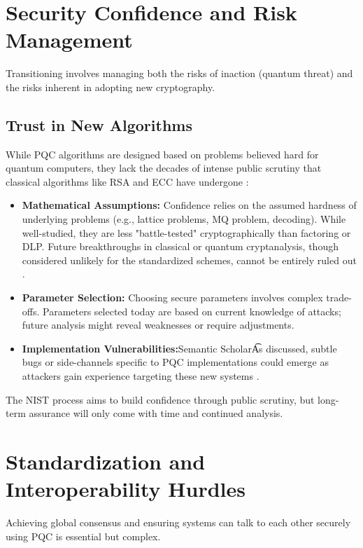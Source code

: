 \newpage

\section{Security Confidence and Risk Management}\label{sec:security_ch7_rev}
Transitioning involves managing both the risks of inaction (quantum threat) and the risks inherent in adopting new cryptography.

\subsection{Trust in New Algorithms}\label{subsec:trust_ch7_rev}
While PQC algorithms are designed based on problems believed hard for quantum computers, they lack the decades of intense public scrutiny that classical algorithms like RSA and ECC have undergone \parencite{security_proofs_2024}:

\begin{itemize}
    \item \textbf{Mathematical Assumptions:} Confidence relies on the assumed hardness of underlying problems (e.g., lattice problems, MQ problem, decoding). While well-studied, they are less "battle-tested" cryptographically than factoring or DLP. Future breakthroughs in classical or quantum cryptanalysis, though considered unlikely for the standardized schemes, cannot be entirely ruled out \parencite{cryptanalysis_2024}.
    \item \textbf{Parameter Selection:} Choosing secure parameters involves complex trade-offs. Parameters selected today are based on current knowledge of attacks; future analysis might reveal weaknesses or require adjustments.
    \item \textbf{Implementation Vulnerabilities:}Semantic Scholar\t As discussed, subtle bugs or side-channels specific to PQC implementations could emerge as attackers gain experience targeting these new systems \parencite{implementation_security_2024}.
\end{itemize}
The NIST process aims to build confidence through public scrutiny, but long-term assurance will only come with time and continued analysis.

\section{Standardization and Interoperability Hurdles}\label{sec:standardization_ch7_rev}
Achieving global consensus and ensuring systems can talk to each other securely using PQC is essential but complex.

